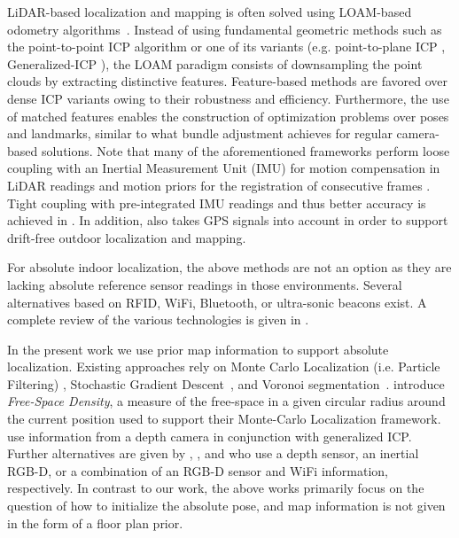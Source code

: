\documentclass[letterpaper, 10 pt, conference]{ieeeconf}  %
\begin{document}
LiDAR-based localization and mapping is often solved using LOAM-based odometry algorithms~\cite{zhang2014loam, zhang2017low, shan2018lego, ye2019tightly, shan2020lio}. Instead of using fundamental geometric methods such as the point-to-point ICP algorithm \cite{besl1992method} or one of its variants (e.g. point-to-plane ICP \cite{rusinkiewicz2001efficient}, Generalized-ICP \cite{segal2009generalized}), the LOAM paradigm consists of downsampling the point clouds by extracting distinctive features. Feature-based methods are favored over dense ICP variants owing to their robustness and efficiency. Furthermore, the use of matched features enables the construction of optimization problems over poses and landmarks, similar to what bundle adjustment achieves for regular camera-based solutions. Note that many of the aforementioned frameworks perform loose coupling with an Inertial Measurement Unit (IMU) for motion compensation in LiDAR readings and motion priors for the registration of consecutive frames \cite{zhang2014loam, zhang2017low, shan2018lego}. Tight coupling with pre-integrated IMU readings and thus better accuracy is achieved in \cite{ye2019tightly, shan2020lio}. In addition, \cite{shan2020lio} also takes GPS signals into account in order to support drift-free outdoor localization and mapping.

For absolute indoor localization, the above methods are not an option as they are lacking absolute reference sensor readings in those environments. Several alternatives based on RFID, WiFi, Bluetooth, or ultra-sonic beacons exist. A complete review of the various technologies is given in \cite{obeidat2021review}.

In the present work we use prior map information to support absolute localization. Existing approaches rely on Monte Carlo Localization (i.e. Particle Filtering) \cite{thrun2001robust,winterhalter2015accurate, maffei2020global, ito2014w, ribacki2018vision, wang2019glfp, boniardi2019robot}, Stochastic Gradient Descent~\cite{li2020online}, and Voronoi segmentation~\cite{hobby2018method}. \cite{ribacki2018vision, maffei2020global} introduce \textit{Free-Space Density}, a measure of the free-space in a given circular radius around the current position used to support their Monte-Carlo Localization framework.
\cite{watanabe2020robust} use information from a depth camera in conjunction with generalized ICP. Further alternatives are given by \cite{maffei2020global}, \cite{winterhalter2015accurate}, and \cite{ito2014w} who use a depth sensor, an inertial RGB-D, or a combination of an RGB-D sensor and WiFi information, respectively. In contrast to our work, the above works primarily focus on the question of how to initialize the absolute pose, and map information is not given in the form of a floor plan prior.
\end{document}
